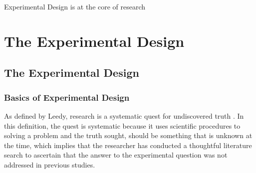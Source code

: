 \documentclass{WileySev}
\begin{document}





\begin{acronyms} 
\end{acronyms}



\begin{glossary}
\end{glossary}
\begin{introduction}
Experimental Design is at the core of research

\end{introduction}

\part[1 Experimental Design]
{The Experimental Design}

\chapter[The Experimental Design]
{The Experimental Design}

\section{Basics of Experimental Design}

As defined by Leedy, research is a systematic quest for undiscovered truth \cite{leedy2005practical}. In this definition, the quest is systematic because it uses scientific procedures to solving a problem and the truth sought, should be something that is unknown at the time, which implies that the researcher has conducted a thoughtful literature search to ascertain that the answer to the experimental question was not addressed in previous studies.
\end{document}
